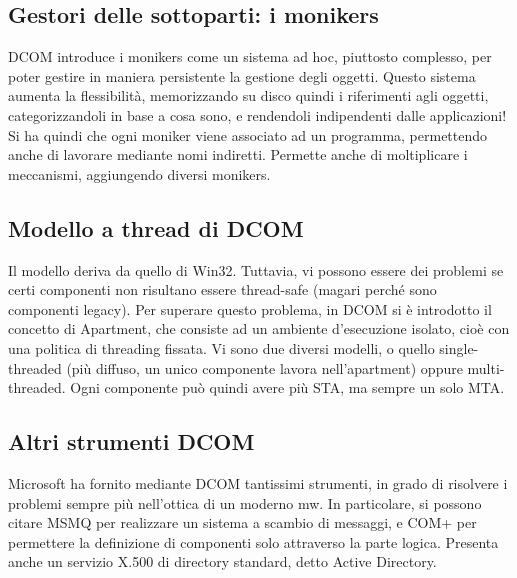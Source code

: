 \subsection{Gestori delle sottoparti: i monikers}
DCOM introduce i monikers come un sistema ad hoc, piuttosto complesso, per poter gestire in maniera persistente la
gestione degli oggetti. Questo sistema aumenta la flessibilità, memorizzando su disco quindi i riferimenti agli oggetti,
categorizzandoli in base a cosa sono, e rendendoli indipendenti dalle applicazioni!
Si ha quindi che ogni moniker viene associato ad un programma, permettendo anche di lavorare mediante nomi indiretti.
Permette anche di moltiplicare i meccanismi, aggiungendo diversi monikers.
\subsection{Modello a thread di DCOM}
Il modello deriva da quello di Win32. Tuttavia, vi possono essere dei problemi se certi componenti non risultano essere
thread-safe (magari perché sono componenti legacy). Per superare questo problema, in DCOM si è introdotto il concetto di
Apartment, che consiste ad un ambiente d'esecuzione isolato, cioè con una politica di threading fissata. Vi sono due
diversi modelli, o quello single-threaded (più diffuso, un unico componente lavora nell'apartment) oppure
multi-threaded. Ogni componente può quindi avere più STA, ma sempre un solo MTA.
\subsection{Altri strumenti DCOM}
Microsoft ha fornito mediante DCOM tantissimi strumenti, in grado di risolvere i problemi sempre più nell'ottica di un
moderno mw.
In particolare, si possono citare MSMQ per realizzare un sistema a scambio di messaggi, e COM+ per permettere la
definizione di componenti solo attraverso la parte logica. Presenta anche un servizio X.500 di directory standard, detto
Active Directory.

